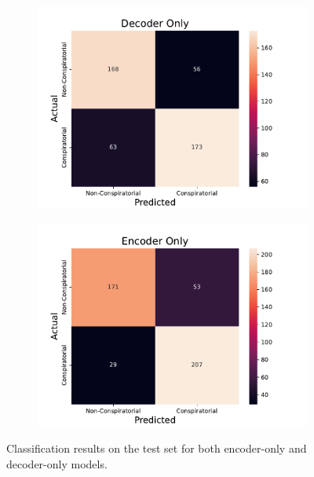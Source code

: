 \documentclass[11pt]{article}
\begin{document}
\begin{figure}
    \centering
    \begin{subfigure}{\columnwidth}
        \centering
        \includegraphics[width=\textwidth]{figures/decoder-only-confusion-matrix.pdf}
    \end{subfigure}
    \begin{subfigure}{\columnwidth}
        \centering
        \includegraphics[width=\textwidth]{figures/encoder-only-confusion-matrix.pdf}
    \end{subfigure}
    \caption{Classification results on the test set for both encoder-only and decoder-only models.}
    \label{fig:confusion-matrix}
\end{figure}
\end{document}
